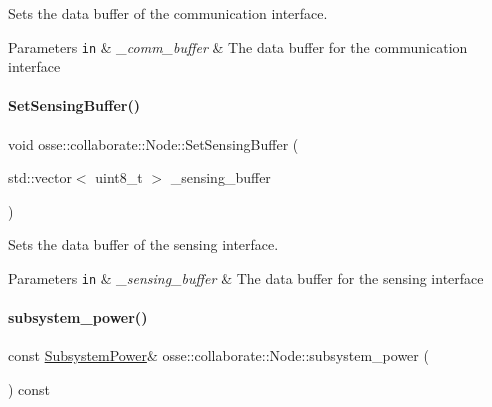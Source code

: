 Sets the data buffer of the communication interface. 


\begin{DoxyParams}[1]{Parameters}
\mbox{\tt in}  & {\em \+\_\+comm\+\_\+buffer} & The data buffer for the communication interface \\
\hline
\end{DoxyParams}
\mbox{\label{classosse_1_1collaborate_1_1_node_a3bba23d7547d2de96f064d1473628d38}} 
\paragraph{\texorpdfstring{Set\+Sensing\+Buffer()}{SetSensingBuffer()}}
{\footnotesize\ttfamily void osse\+::collaborate\+::\+Node\+::\+Set\+Sensing\+Buffer (\begin{DoxyParamCaption}\item[{std\+::vector$<$ uint8\+\_\+t $>$}]{\+\_\+sensing\+\_\+buffer }\end{DoxyParamCaption})}



Sets the data buffer of the sensing interface. 


\begin{DoxyParams}[1]{Parameters}
\mbox{\tt in}  & {\em \+\_\+sensing\+\_\+buffer} & The data buffer for the sensing interface \\
\hline
\end{DoxyParams}
\mbox{\label{classosse_1_1collaborate_1_1_node_a62c89064d7fb5c92822518cdc996f8f6}} 
\paragraph{\texorpdfstring{subsystem\+\_\+power()}{subsystem\_power()}}
{\footnotesize\ttfamily const \hyperlink{classosse_1_1collaborate_1_1_subsystem_power}{Subsystem\+Power}\& osse\+::collaborate\+::\+Node\+::subsystem\+\_\+power (\begin{DoxyParamCaption}{ }\end{DoxyParamCaption}) const\hspace{0.3cm}{\ttfamily [inline]}}



